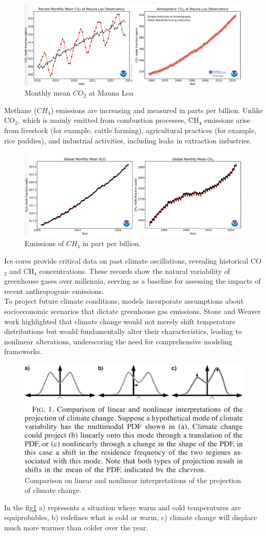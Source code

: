 \begin{figure}[htpb]
    \centering
    \includegraphics[width=0.5\linewidth]{uploads/co2image.png}
    \caption{Monthly mean $CO_2$ at Mauna Loa}
 
\end{figure}
Methane ($CH_4$) emissions are increasing and measured in parts per billion. Unlike CO$_2$, which is mainly emitted from combustion processes, CH$_4$ emissions arise from livestock (for example, cattle farming), agricultural practices (for example, rice paddies), and industrial activities, including leaks in extraction industries.
\begin{figure}[htpb]
    \centering
    \includegraphics[width=0.5\linewidth]{uploads/ch4.png}
    \caption{Emissions of $CH_4$ in part per billion.}
   
\end{figure}
Ice cores provide critical data on past climate oscillations, revealing historical CO$_2$ and CH$_4$ concentrations. These records show the natural variability of greenhouse gases over millennia, serving as a baseline for assessing the impacts of recent anthropogenic emissions.\\




To project future climate conditions, models incorporate assumptions about socioeconomic scenarios that dictate greenhouse gas emissions. Stone and Weaver\cite{Stone2000} work highlighted that climate change would not merely shift temperature distributions but would fundamentally alter their characteristics, leading to nonlinear alterations, underscoring the need for comprehensive modeling frameworks.

\begin{figure}[htpb]
    \centering
    \includegraphics[width=0.5\linewidth]{uploads/nonlinclimatechange.png}
    \caption{Comparison on linear and nonlinear interpretations of the projection of climate change.}
    \label{fig:clim model}
\end{figure}
In the fig\ref{fig:clim model} a) represents a situation where warm and cold temperatures are equiprobables, b) redefines what is cold or warm, c) climate change will displace much more warmer than colder over the year.

